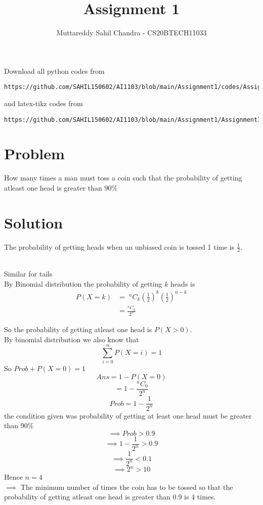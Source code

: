 \documentclass[journal,12pt,twocolumn]{IEEEtran}
\begin{document}
\title{Assignment 1}
\author{Muttareddy Sahil Chandra - CS20BTECH11033}
\maketitle
\newpage
\bigskip
\renewcommand{\thefigure}{\theenumi}
\renewcommand{\thetable}{\theenumi}
Download all python codes from 
\begin{lstlisting}
https://github.com/SAHIL150602/AI1103/blob/main/Assignment1/codes/Assignment.py
\end{lstlisting}
%
and latex-tikz codes from 
%
\begin{lstlisting}
https://github.com/SAHIL150602/AI1103/blob/main/Assignment1/Assignment1.tex
\end{lstlisting}
\section{Problem}
How many times a man must toss a coin such that the probability of getting atleast one head is greater than $90\%$
\section{Solution} 
The probability of getting heads when an unbiased coin is tossed 1 time  is {\large$\frac{1}{2}$}.

  \\ Similar for tails
  \\By Binomial distribution the probability of getting $k$ heads is
  \begin{equation}
      \begin{split}
        P(X = k) & =\;  ^nC_k \left(\frac{1}{2}\right)^k \left(\frac{1}{2}\right)^{n-k}\\   & =\frac{^nC_k}{2^n}  
      \end{split}
  \end{equation}
     
  So the probability of getting atleast one head is $P(X>0) $.\\
  By binomial distribution we also know that 
  \[\sum_{i=0}^{n}P(X=i)=1\]
  So    \;\;\;\;\;\;\;\;\;\;\;\;\;    $Prob + P(X=0)=1$
  $$Ans = 1-P(X=0)$$
  $$= 1-\frac{^nC_0}{2^n}$$
  $$Prob =1- \frac{1}{2^n}$$
  the condition given was probability of getting at least one head must be greater than  $90\%$
  $$\implies  Prob>0.9$$
  $$\implies 1-\frac{1}{2^n}>0.9$$
  $$\implies\frac{1}{2^n}<0.1$$
  $$\implies 2^n>10$$
  Hence $n =4$\\
$\implies$ The minimum number of times the coin has to be tossed so that the probability  of getting atleast one head is greater than 0.9 is 4 times.    
\end{document}
